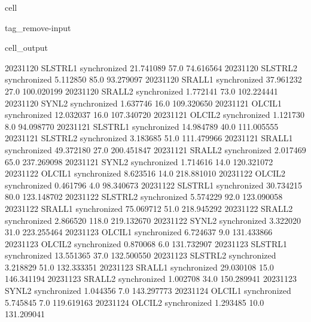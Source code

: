 \documentclass[letterpaper,10pt,english]{jupyterBook}
\begin{document}
\begin{sphinxuseclass}{cell}
\begin{sphinxuseclass}{tag_remove-input}
\begin{sphinxVerbatimOutput}
\begin{sphinxuseclass}{cell_output}
\begin{sphinxVerbatim}[commandchars=\\\{\}]
2023\PYGZhy{}11\PYGZhy{}20     SLSTR\PYGZus{}L1  synchronized   21.741089    57.0   74.616564
2023\PYGZhy{}11\PYGZhy{}20     SLSTR\PYGZus{}L2  synchronized    5.112850    85.0   93.279097
2023\PYGZhy{}11\PYGZhy{}20      SRAL\PYGZus{}L1  synchronized   37.961232    27.0  100.020199
2023\PYGZhy{}11\PYGZhy{}20      SRAL\PYGZus{}L2  synchronized    1.772141    73.0  102.224441
2023\PYGZhy{}11\PYGZhy{}20       SYN\PYGZus{}L2  synchronized    1.637746    16.0  109.320650
2023\PYGZhy{}11\PYGZhy{}21      OLCI\PYGZus{}L1  synchronized   12.032037    16.0  107.340720
2023\PYGZhy{}11\PYGZhy{}21      OLCI\PYGZus{}L2  synchronized    1.121730     8.0   94.098770
2023\PYGZhy{}11\PYGZhy{}21     SLSTR\PYGZus{}L1  synchronized   14.984789    40.0  111.005555
2023\PYGZhy{}11\PYGZhy{}21     SLSTR\PYGZus{}L2  synchronized    3.183685    51.0  111.479966
2023\PYGZhy{}11\PYGZhy{}21      SRAL\PYGZus{}L1  synchronized   49.372180    27.0  200.451847
2023\PYGZhy{}11\PYGZhy{}21      SRAL\PYGZus{}L2  synchronized    2.017469    65.0  237.269098
2023\PYGZhy{}11\PYGZhy{}21       SYN\PYGZus{}L2  synchronized    1.714616    14.0  120.321072
2023\PYGZhy{}11\PYGZhy{}22      OLCI\PYGZus{}L1  synchronized    8.623516    14.0  218.881010
2023\PYGZhy{}11\PYGZhy{}22      OLCI\PYGZus{}L2  synchronized    0.461796     4.0   98.340673
2023\PYGZhy{}11\PYGZhy{}22     SLSTR\PYGZus{}L1  synchronized   30.734215    80.0  123.148702
2023\PYGZhy{}11\PYGZhy{}22     SLSTR\PYGZus{}L2  synchronized    5.574229    92.0  123.090058
2023\PYGZhy{}11\PYGZhy{}22      SRAL\PYGZus{}L1  synchronized   75.069712    51.0  218.945292
2023\PYGZhy{}11\PYGZhy{}22      SRAL\PYGZus{}L2  synchronized    2.866520   118.0  219.132670
2023\PYGZhy{}11\PYGZhy{}22       SYN\PYGZus{}L2  synchronized    3.322020    31.0  223.255464
2023\PYGZhy{}11\PYGZhy{}23      OLCI\PYGZus{}L1  synchronized    6.724637     9.0  131.433866
2023\PYGZhy{}11\PYGZhy{}23      OLCI\PYGZus{}L2  synchronized    0.870068     6.0  131.732907
2023\PYGZhy{}11\PYGZhy{}23     SLSTR\PYGZus{}L1  synchronized   13.551365    37.0  132.500550
2023\PYGZhy{}11\PYGZhy{}23     SLSTR\PYGZus{}L2  synchronized    3.218829    51.0  132.333351
2023\PYGZhy{}11\PYGZhy{}23      SRAL\PYGZus{}L1  synchronized   29.030108    15.0  146.341194
2023\PYGZhy{}11\PYGZhy{}23      SRAL\PYGZus{}L2  synchronized    1.002708    34.0  150.289941
2023\PYGZhy{}11\PYGZhy{}23       SYN\PYGZus{}L2  synchronized    1.044356     7.0  143.297773
2023\PYGZhy{}11\PYGZhy{}24      OLCI\PYGZus{}L1  synchronized    5.745845     7.0  119.619163
2023\PYGZhy{}11\PYGZhy{}24      OLCI\PYGZus{}L2  synchronized    1.293485    10.0  131.209041

\end{sphinxVerbatim}
\end{sphinxuseclass}
\end{sphinxVerbatimOutput}
\end{sphinxuseclass}
\end{sphinxuseclass}
\end{document}

